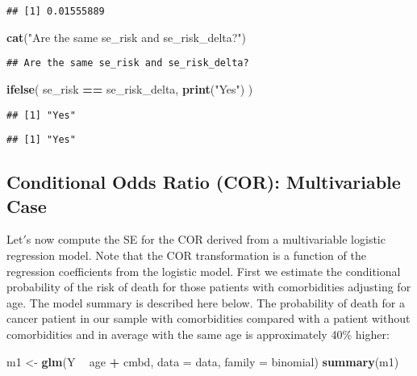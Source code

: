 \documentclass[]{article}
\newenvironment{Shaded}{\begin{snugshade}}{\end{snugshade}}
\newcommand{\DataTypeTok}[1]{\textcolor[rgb]{0.13,0.29,0.53}{#1}}
\newcommand{\KeywordTok}[1]{\textcolor[rgb]{0.13,0.29,0.53}{\textbf{#1}}}
\newcommand{\NormalTok}[1]{#1}
\newcommand{\OperatorTok}[1]{\textcolor[rgb]{0.81,0.36,0.00}{\textbf{#1}}}
\newcommand{\StringTok}[1]{\textcolor[rgb]{0.31,0.60,0.02}{#1}}
\begin{document}
\begin{verbatim}
## [1] 0.01555889
\end{verbatim}

\begin{Shaded}
\begin{Highlighting}[]
\KeywordTok{cat}\NormalTok{(}\StringTok{"Are the same se_risk and se_risk_delta?"}\NormalTok{)}
\end{Highlighting}
\end{Shaded}

\begin{verbatim}
## Are the same se_risk and se_risk_delta?
\end{verbatim}

\begin{Shaded}
\begin{Highlighting}[]
\KeywordTok{ifelse}\NormalTok{(}
\NormalTok{  se_risk }\OperatorTok{==}\StringTok{ }\NormalTok{se_risk_delta,}
  \KeywordTok{print}\NormalTok{(}\StringTok{"Yes"}\NormalTok{)}
\NormalTok{)}
\end{Highlighting}
\end{Shaded}

\begin{verbatim}
## [1] "Yes"
\end{verbatim}

\begin{verbatim}
## [1] "Yes"
\end{verbatim}

\hypertarget{conditional-odds-ratio-cor-multivariable-case}{%
\subsection{Conditional Odds Ratio (COR): Multivariable
Case}\label{conditional-odds-ratio-cor-multivariable-case}}

Let\('\)s now compute the SE for the COR derived from a multivariable
logistic regression model. Note that the COR transformation is a
function of the regression coefficients from the logistic model. First
we estimate the conditional probability of the risk of death for those
patients with comorbidities adjusting for age. The model summary is
described here below. The probability of death for a cancer patient in
our sample with comorbidities compared with a patient without
comorbidities and in average with the same age is approximately 40\%
higher:

\begin{Shaded}
\begin{Highlighting}[]
\NormalTok{m1 <-}\StringTok{ }\KeywordTok{glm}\NormalTok{(Y }\OperatorTok{~}\StringTok{ }\NormalTok{age }\OperatorTok{+}\StringTok{ }\NormalTok{cmbd, }\DataTypeTok{data =}\NormalTok{ data, }\DataTypeTok{family =}\NormalTok{ binomial)}
\KeywordTok{summary}\NormalTok{(m1)}
\end{Highlighting}
\end{Shaded}
\end{document}
